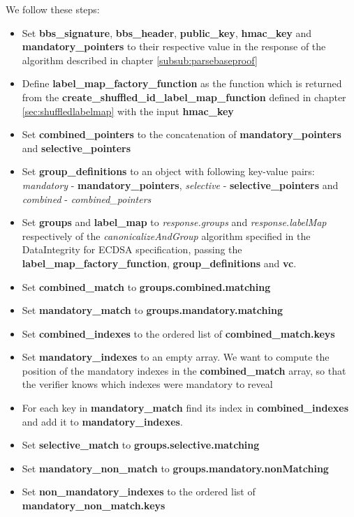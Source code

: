 \documentclass[
	a4paper               %
	,bibliography=totoc   %
	,listof=totoc         %
	,monolingual
]{bfhthesis}              %
\begin{document}
We follow these steps:
\begin{itemize}
	\item Set \textbf{bbs\_signature}, \textbf{bbs\_header}, \textbf{public\_key}, \textbf{hmac\_key} and \textbf{mandatory\_pointers} to their respective value in the response of the algorithm described in chapter \ref{subsub:parsebaseproof}
	\item Define \textbf{label\_map\_factory\_function} as the function which is returned from the \textbf{create\_shuffled\_id\_label\_map\_function} defined in chapter \ref{sec:shuffledlabelmap} with the input \textbf{hmac\_key}
	\item Set \textbf{combined\_pointers} to the concatenation of \textbf{mandatory\_pointers} and \textbf{selective\_pointers}
	\item Set \textbf{group\_definitions} to an object with following key-value pairs: \textit{mandatory} - \textbf{mandatory\_pointers}, \textit{selective} - \textbf{selective\_pointers} and \textit{combined} - \textit{combined\_pointers}
	\item Set \textbf{groups} and \textbf{label\_map} to \textit{response.groups} and \textit{response.labelMap} respectively of the \textit{canonicalizeAndGroup} algorithm specified in the DataIntegrity for ECDSA specification\cite{ecdsa}, passing the \textbf{label\_map\_factory\_function}, \textbf{group\_definitions} and \textbf{vc}.
	\item Set \textbf{combined\_match} to \textbf{groups.combined.matching}
	\item Set \textbf{mandatory\_match} to \textbf{groups.mandatory.matching}
	\item Set \textbf{combined\_indexes} to the ordered list of \textbf{combined\_match.keys}
	\item Set \textbf{mandatory\_indexes} to an empty array. We want to compute the position of the mandatory indexes in the \textbf{combined\_match} array, so that the verifier knows which indexes were mandatory to reveal
	\item For each key in \textbf{mandatory\_match} find its index in \textbf{combined\_indexes} and add it to \textbf{mandatory\_indexes}.
	\item Set \textbf{selective\_match} to \textbf{groups.selective.matching}
	\item Set \textbf{mandatory\_non\_match} to \textbf{groups.mandatory.nonMatching}
	\item Set \textbf{non\_mandatory\_indexes} to the ordered list of \textbf{mandatory\_non\_match.keys}

\end{itemize}
\end{document}
